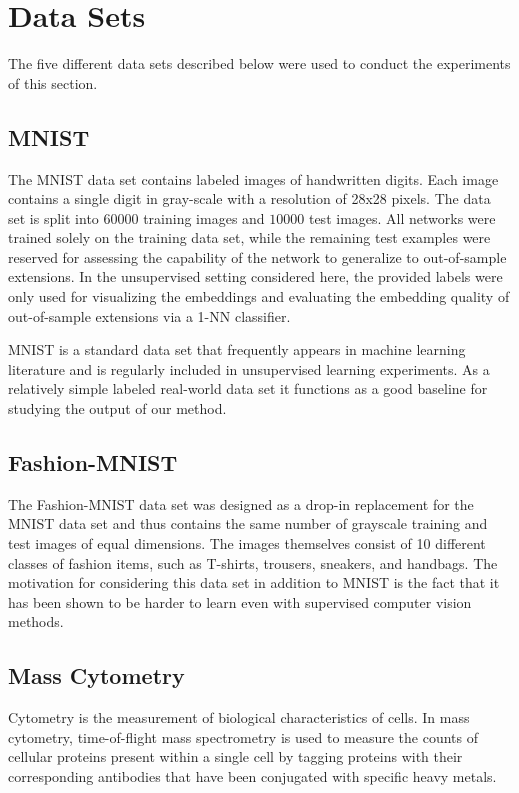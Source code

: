 \section{Data Sets}

The five different data sets described below were used to conduct the experiments of this section.

\subsection{MNIST}

The MNIST data set \cite{mnist} contains labeled images of handwritten digits. Each image contains a single digit in gray-scale with a resolution of 28x28 pixels. The data set is split into $60000$ training images and $10000$ test images. All networks were trained solely on the training data set, while the remaining test examples were reserved for assessing the capability of the network to generalize to out-of-sample extensions. In the unsupervised setting considered here, the provided labels were only used for visualizing the embeddings and evaluating the embedding quality of out-of-sample extensions via a 1-NN classifier.

MNIST is a standard data set that frequently appears in machine learning literature and is regularly included in unsupervised learning experiments. As a relatively simple labeled real-world data set it functions as a good baseline for studying the output of our method.

\subsection{Fashion-MNIST}

The Fashion-MNIST data set \cite{fashion_mnist} was designed as a drop-in replacement for the MNIST data set and thus contains the same number of grayscale training and test images of equal dimensions. The images themselves consist of 10 different classes of fashion items, such as T-shirts, trousers, sneakers, and handbags. The motivation for considering this data set in addition to MNIST is the fact that it has been shown to be harder to learn even with supervised computer vision methods.

\subsection{Mass Cytometry}

Cytometry is the measurement of biological characteristics of cells. In mass cytometry, time-of-flight mass spectrometry is used to measure the counts of cellular proteins present within a single cell by tagging proteins with their corresponding antibodies that have been conjugated with specific heavy metals.

